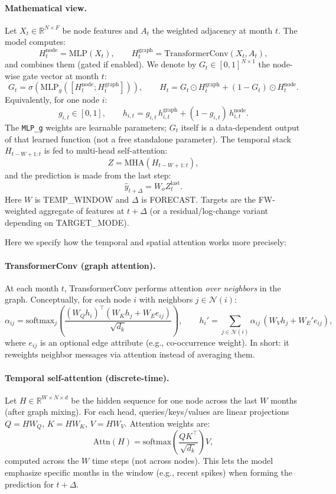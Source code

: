 \documentclass[pdflatex,sn-basic]{sn-jnl}
\begin{document}
\paragraph{Mathematical view.}
Let $X_t \in \mathbb{R}^{N \times F}$ be node features and $A_t$ the weighted adjacency at month $t$.
The model computes:
\[
H_t^{\text{node}} = \mathrm{MLP}(X_t), \qquad
H_t^{\text{graph}} = \mathrm{TransformerConv}(X_t, A_t),
\]
and combines them (gated if enabled). We denote by $G_t \in [0,1]^{N \times 1}$ the
node-wise gate vector at month $t$:
\[
G_t = \sigma\!\left(\mathrm{MLP}_g\!\left([H_t^{\text{node}} ; H_t^{\text{graph}}]\right)\right), \qquad
H_t = G_t \odot H_t^{\text{graph}} + (1-G_t)\odot H_t^{\text{node}}.
\]
Equivalently, for one node $i$:
\[
g_{i,t}\in[0,1], \qquad
h_{i,t} = g_{i,t}\,h_{i,t}^{\text{graph}} + (1-g_{i,t})\,h_{i,t}^{\text{node}}.
\]
The \texttt{MLP\_g} weights are learnable parameters; $G_t$ itself is a data-dependent
output of that learned function (not a free standalone parameter).
The temporal stack $H_{t-W+1:t}$ is fed to multi-head self-attention:
\[
Z = \mathrm{MHA}(H_{t-W+1:t}),
\]
and the prediction is made from the last step:
\[
\hat{y}_{t+\Delta} = W_o Z_{t}^{\text{last}}.
\]
Here $W$ is TEMP\_WINDOW and $\Delta$ is FORECAST. Targets are the FW-weighted aggregate of features
at $t+\Delta$ (or a residual/log-change variant depending on TARGET\_MODE).

Here we specify how the temporal and spatial attention works more precisely:

\paragraph{TransformerConv (graph attention).}
At each month $t$, TransformerConv performs attention \emph{over neighbors} in the graph.
Conceptually, for each node $i$ with neighbors $j \in \mathcal{N}(i)$:
\[
\alpha_{ij} = \mathrm{softmax}_j\!\left(\frac{(W_Q h_i)^\top (W_K h_j + W_E e_{ij})}{\sqrt{d_k}}\right),
\qquad
h_i' = \sum_{j \in \mathcal{N}(i)} \alpha_{ij}\,(W_V h_j + W_E' e_{ij}),
\]
where $e_{ij}$ is an optional edge attribute (e.g., co-occurrence weight).
In short: it reweights neighbor messages via attention instead of averaging them.


\paragraph{Temporal self-attention (discrete-time).}
Let $H \in \mathbb{R}^{W \times N \times d}$ be the hidden sequence for one node across the last
$W$ months (after graph mixing). For each head, queries/keys/values are linear projections
$Q = HW_Q$, $K = HW_K$, $V = HW_V$. Attention weights are:
\[
\mathrm{Attn}(H) = \mathrm{softmax}\!\left(\frac{QK^\top}{\sqrt{d_k}}\right) V,
\]
computed across the $W$ time steps (not across nodes). This lets the model emphasize specific
months in the window (e.g., recent spikes) when forming the prediction for $t+\Delta$.
\end{document}
